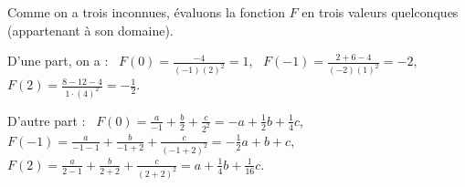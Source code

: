                               \begin{valiny}
                              Comme on a \textcolor{loko2}{trois} inconnues, 
                              \'evaluons la fonction $F$ en \textcolor{loko2}{trois valeurs} quelconques
                              (appartenant \`a son domaine).
                              
                              \begin{minipage}{.35\linewidth}
	                              D'une part, on a : \newline
                                    \textbullet\ $F(0)  = \frac{-4}{(-1) (2)^2} =  1 $, \newline
                                    \textbullet\ $F(-1) = \frac{2 + 6 - 4}{(-2)(1)^2} = -2 $, \newline
                                    \textbullet\ $F(2)  = \frac{8 - 12 -4}{1 \cdot (4)^2} =-\frac{1}{2} $.
                              \end{minipage}
											\begin{minipage}{.60\linewidth}
											D'autre part : \newline
											\textbullet\ $F(0)	= \frac{a}{-1} + \frac{b}{2} + \frac{c}{2^2} 
															= - a + \frac{1}{2} b + \frac{1}{4} c$, \newline
											\textbullet\ $F(-1)	= \frac{a}{-1-1} + \frac{b}{-1+2} + \frac{c}{(-1+2)^2} 
															= -\frac{1}{2} a + b + c$, \newline
											\textbullet\ $F(2)	= \frac{a}{2-1} + \frac{b}{2+2} + \frac{c}{(2+2)^2} 
															= a + \frac{1}{4} b + \frac{1}{16} c$.
										\end{minipage}
                              

\end{valiny}
